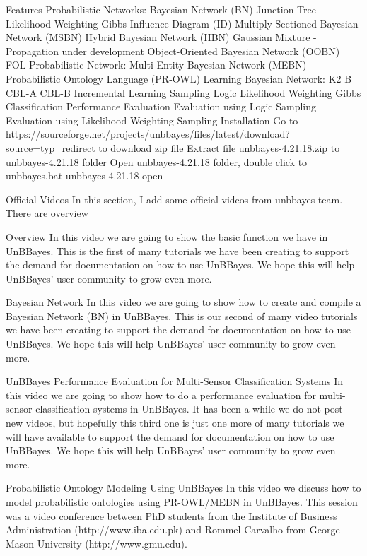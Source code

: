 Features
Probabilistic Networks:
Bayesian Network (BN)
Junction Tree
Likelihood Weighting
Gibbs
Influence Diagram (ID)
Multiply Sectioned Bayesian Network (MSBN)
Hybrid Bayesian Network (HBN)
Gaussian Mixture - Propagation under development
Object-Oriented Bayesian Network (OOBN)
FOL Probabilistic Network:
Multi-Entity Bayesian Network (MEBN)
Probabilistic Ontology Language (PR-OWL)
Learning Bayesian Network:
K2
B
CBL-A
CBL-B
Incremental Learning
Sampling
Logic
Likelihood Weighting
Gibbs
Classification Performance Evaluation
Evaluation using Logic Sampling
Evaluation using Likelihood Weighting Sampling
Installation
Go to https://sourceforge.net/projects/unbbayes/files/latest/download?source=typ_redirect to download zip file
Extract file unbbayes-4.21.18.zip to unbbayes-4.21.18 folder
Open unbbayes-4.21.18 folder, double click to unbbayes.bat
unbbayes-4.21.18 open

Official Videos
In this section, I add some official videos from unbbayes team. There are overview

Overview
In this video we are going to show the basic function we have in UnBBayes. This is the first of many tutorials we have been creating to support the demand for documentation on how to use UnBBayes. We hope this will help UnBBayes' user community to grow even more.


Bayesian Network
In this video we are going to show how to create and compile a Bayesian Network (BN) in UnBBayes. This is our second of many video tutorials we have been creating to support the demand for documentation on how to use UnBBayes. We hope this will help UnBBayes' user community to grow even more.


UnBBayes Performance Evaluation for Multi-Sensor Classification Systems
In this video we are going to show how to do a performance evaluation for multi-sensor classification systems in UnBBayes. It has been a while we do not post new videos, but hopefully this third one is just one more of many tutorials we will have available to support the demand for documentation on how to use UnBBayes. We hope this will help UnBBayes' user community to grow even more.


Probabilistic Ontology Modeling Using UnBBayes
In this video we discuss how to model probabilistic ontologies using PR-OWL/MEBN in UnBBayes. This session was a video conference between PhD students from the Institute of Business Administration (http://www.iba.edu.pk) and Rommel Carvalho from George Mason University (http://www.gmu.edu).

